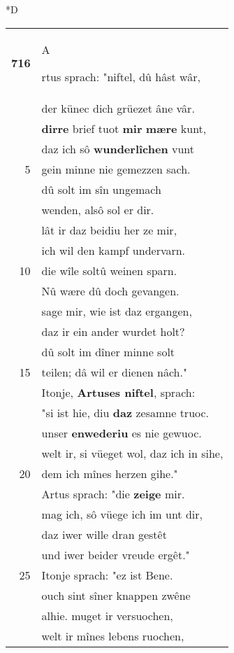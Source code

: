 \documentclass[8pt,a4paper,notitlepage]{article}
\begin{document}
\begin{table}[ht]
\begin{minipage}[t]{0.5\linewidth}
\small
\begin{center}*D
\end{center}
\begin{tabular}{rl}
\textbf{716} & \begin{large}A\end{large}rtus sprach: "niftel, dû hâst wâr,\\ 
 & der künec dich grüezet âne vâr.\\ 
 & \textbf{dirre} brief tuot \textbf{mir} \textbf{mære} kunt,\\ 
 & daz ich sô \textbf{wunderlîchen} vunt\\ 
5 & gein minne nie gemezzen sach.\\ 
 & dû solt im sîn ungemach\\ 
 & wenden, alsô sol er dir.\\ 
 & lât ir daz beidiu her ze mir,\\ 
 & ich wil den kampf undervarn.\\ 
10 & die wîle soltû weinen sparn.\\ 
 & Nû wære dû doch gevangen.\\ 
 & sage mir, wie ist daz ergangen,\\ 
 & daz ir ein ander wurdet holt?\\ 
 & dû solt im dîner minne solt\\ 
15 & teilen; dâ wil er dienen nâch."\\ 
 & Itonje, \textbf{Artuses niftel}, sprach:\\ 
 & "si ist hie, diu \textbf{daz} zesamne truoc.\\ 
 & unser \textbf{enwederiu} es nie gewuoc.\\ 
 & welt ir, si vüeget wol, daz ich in sihe,\\ 
20 & dem ich mînes herzen gihe."\\ 
 & Artus sprach: "die \textbf{zeige} mir.\\ 
 & mag ich, sô vüege ich im unt dir,\\ 
 & daz iwer wille dran gestêt\\ 
 & und iwer beider vreude ergêt."\\ 
25 & Itonje sprach: "ez ist Bene.\\ 
 & ouch sint sîner knappen zwêne\\ 
 & alhie. muget ir versuochen,\\ 
 & welt ir mînes lebens ruochen,\\ 

\end{tabular}
\end{minipage}
\end{table}
\end{document}
